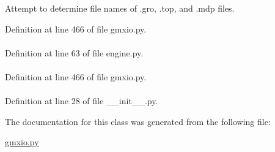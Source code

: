 \-Attempt to determine file names of .gro, .top, and .mdp files. 



\-Definition at line 466 of file gmxio.\-py.

\hypertarget{classforcebalance_1_1engine_1_1Engine_a5e2383d62ef4df388a04c1c8b8409cab}{
\paragraph[{target}]{}}\label{classforcebalance_1_1engine_1_1Engine_a5e2383d62ef4df388a04c1c8b8409cab}


\-Definition at line 63 of file engine.\-py.

\hypertarget{classforcebalance_1_1gmxio_1_1GMX_a028f08b3c967c49c38855b75bb5ea629}{
\paragraph[{top}]{}}\label{classforcebalance_1_1gmxio_1_1GMX_a028f08b3c967c49c38855b75bb5ea629}


\-Definition at line 466 of file gmxio.\-py.

\hypertarget{classforcebalance_1_1BaseClass_afd68efa29ccd2f320f4cf82198214aac}{
\paragraph[{verbose\-\_\-options}]{}}\label{classforcebalance_1_1BaseClass_afd68efa29ccd2f320f4cf82198214aac}


\-Definition at line 28 of file \-\_\-\-\_\-init\-\_\-\-\_\-.\-py.



\-The documentation for this class was generated from the following file\-:\begin{DoxyCompactItemize}
\item 
\hyperlink{gmxio_8py}{gmxio.\-py}\end{DoxyCompactItemize}
